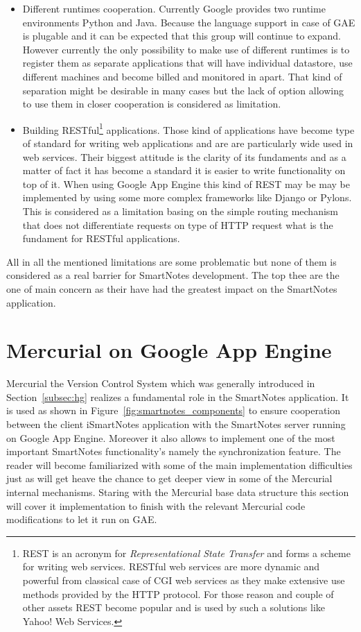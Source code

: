 \begin{itemize}
\item{Different runtimes cooperation. Currently Google provides two runtime environments Python and Java. Because the language support in case of GAE is plugable and it can be expected that this group will continue to expand. However currently the only possibility to make use of different runtimes is to register them as separate applications that will have individual datastore, use different machines and become billed and monitored in apart. That kind of separation might be desirable in many cases but the lack of option allowing to use them in closer cooperation is considered as limitation.}

\item{Building RESTful\footnote{REST is an acronym for \textit{Representational State Transfer} and forms a scheme for writing web services. RESTful web services are more dynamic and powerful from classical case of CGI web services as they make extensive use  methods provided by the HTTP protocol. For those reason and couple of other assets REST become popular and is used by such a solutions like Yahoo! Web Services.} applications. Those kind of applications have become type of standard for writing web applications and are are particularly wide used in web services. Their biggest attitude is the clarity of its fundaments and as a matter of fact it has become a standard it is easier to write functionality on top of it. When using Google App Engine this kind of REST may be may be implemented by using some more complex frameworks like Django or Pylons. This is considered as a limitation basing on the simple routing mechanism that does not differentiate requests on type of HTTP request what is the fundament for RESTful applications.}
\end{itemize}
All in all the mentioned limitations are some problematic but none of them is considered as a real barrier for SmartNotes development. The top thee are the one of main concern as their have had the greatest impact on the SmartNotes application. 
\section{Mercurial on Google App Engine}\label{sec:hg_on_gae}
Mercurial the Version Control System which was generally introduced in Section~\ref{subsec:hg} realizes a fundamental role in the SmartNotes application. It is used as shown in Figure~\ref{fig:smartnotes_components} to ensure cooperation between the client iSmartNotes application with the SmartNotes server running on Google App Engine. Moreover it also allows to implement one of the most important SmartNotes functionality's namely the synchronization feature. The reader will become familiarized with some of the main implementation difficulties just as will get heave the chance to get deeper view in some of the Mercurial internal mechanisms. Staring with the Mercurial base data structure this section will cover it implementation to finish with the relevant Mercurial code modifications to let it run on GAE.         

